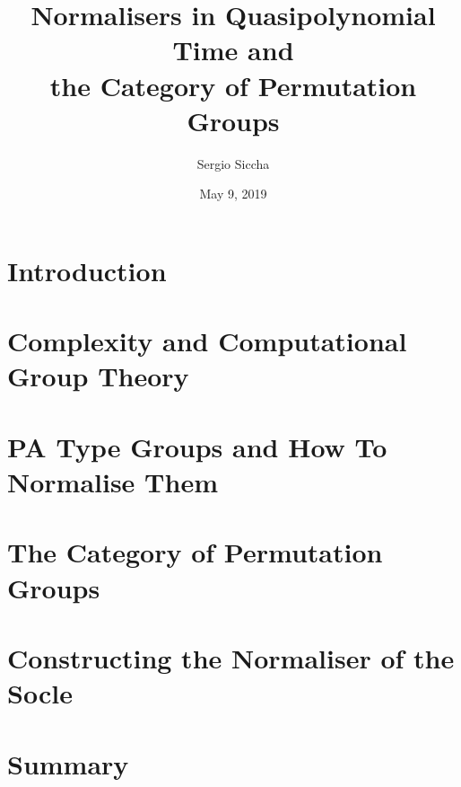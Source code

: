 \documentclass{beamer}
\title{Normalisers in Quasipolynomial Time and \\
the Category of Permutation Groups}
\date{May 9, 2019}
\author{Sergio Siccha}
\institute{Lehr- und Forschungsgebiet Algebra, RWTH Aachen}
\theoremstyle{plain}
\theoremstyle{definition}
\begin{document}
\maketitle
{}

\section{Introduction}


\section{Complexity and Computational Group Theory}


\section{PA Type Groups and How To Normalise Them}


\section{The Category of Permutation Groups}


\section{Constructing the Normaliser of the Socle}


\section{Summary}


\appendix

\end{document}
